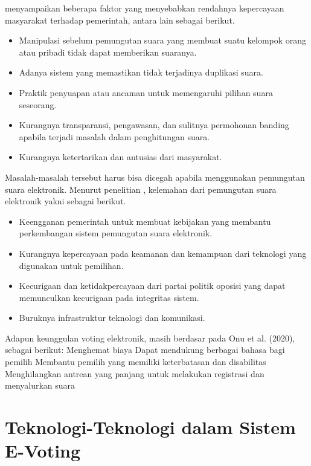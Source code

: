 \cite{8651451} menyampaikan beberapa faktor yang menyebabkan rendahnya kepercayaan masyarakat terhadap pemerintah, antara lain sebagai berikut.

\begin{itemize}
    \setlength\itemsep{-0.5em}
    \item Manipulasi sebelum pemungutan suara yang membuat suatu kelompok orang atau pribadi tidak dapat memberikan suaranya.
    \item Adanya sistem yang memastikan tidak terjadinya duplikasi suara.
    \item Praktik penyuapan atau ancaman untuk memengaruhi pilihan suara seseorang.
    \item Kurangnya transparansi, pengawasan, dan sulitnya permohonan banding apabila terjadi masalah dalam penghitungan suara.
    \item Kurangnya ketertarikan dan antusias dari masyarakat.
\end{itemize}

Masalah-masalah tersebut harus bisa dicegah apabila menggunakan pemungutan suara elektronik. Menurut penelitian \cite{onu}, kelemahan dari pemungutan suara elektronik yakni sebagai berikut.

\begin{itemize}
    \setlength\itemsep{-0.5em}
    \item Keengganan pemerintah untuk membuat kebijakan yang membantu perkembangan sistem pemungutan suara elektronik.
    \item Kurangnya kepercayaan pada keamanan dan kemampuan dari teknologi yang digunakan untuk pemilihan.
    \item Kecurigaan dan ketidakpercayaan dari partai politik oposisi yang dapat memunculkan kecurigaan pada integritas sistem.
    \item Buruknya infrastruktur teknologi dan komunikasi.
\end{itemize}

Adapun keunggulan voting elektronik, masih berdasar pada Onu et al. (2020), sebagai berikut:
Menghemat biaya
Dapat mendukung berbagai bahasa bagi pemilih
Membantu pemilih yang memiliki keterbatasan dan disabilitas
Menghilangkan antrean yang panjang untuk melakukan registrasi dan menyalurkan suara


\section{Teknologi-Teknologi dalam Sistem E-Voting}

